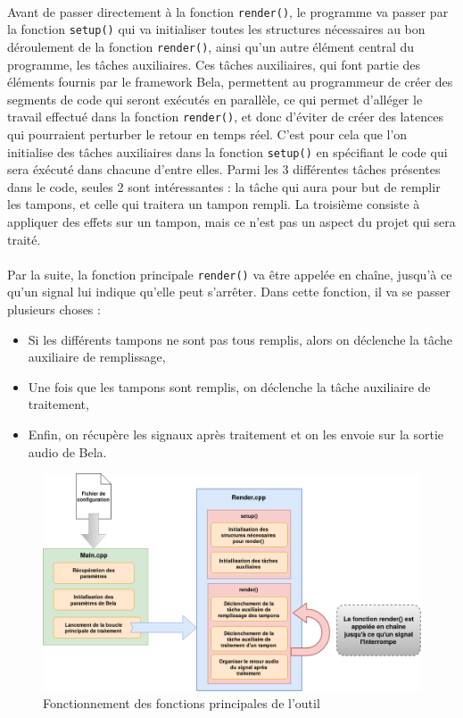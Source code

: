 \paragraph{}
Avant de passer directement à la fonction \verb!render()!, le programme va passer par la fonction \verb!setup()! qui va initialiser toutes les structures nécessaires au bon déroulement de la fonction \verb!render()!, ainsi qu'un autre élément central du programme, les tâches auxiliaires. Ces tâches auxiliaires, qui font partie des éléments fournis par le framework Bela, permettent au programmeur de créer des segments de code qui seront exécutés en parallèle, ce qui permet d'alléger le travail effectué dans la fonction \verb!render()!, et donc d'éviter de créer des latences qui pourraient perturber le retour en temps réel. C'est pour cela que l'on initialise des tâches auxiliaires dans la fonction \verb!setup()! en spécifiant le code qui sera éxécuté dans chacune d'entre elles. Parmi les 3 différentes tâches présentes dans le code, seules 2 sont intéressantes : la tâche qui aura pour but de remplir les tampons, et celle qui traitera un tampon rempli. La troisième consiste à appliquer des effets sur un tampon, mais ce n'est pas un aspect du projet qui sera traité.
\paragraph{}
Par la suite, la fonction principale \verb!render()! va être appelée en chaîne, jusqu'à ce qu'un signal lui indique qu'elle peut s'arrêter. Dans cette fonction, il va se passer plusieurs choses : 
\begin{itemize}
    \item Si les différents tampons ne sont pas tous remplis, alors on déclenche la tâche auxiliaire de remplissage,
    \item Une fois que les tampons sont remplis, on déclenche la tâche auxiliaire de traitement,
    \item Enfin, on récupère les signaux après traitement et on les envoie sur la sortie audio de Bela.
\end{itemize}
\begin{figure}[H]
    \centering
    \includegraphics[scale=0.4]{assets/render.png}
    \caption{Fonctionnement des fonctions principales de l'outil}
    \label{focntionnement main render}
\end{figure}
